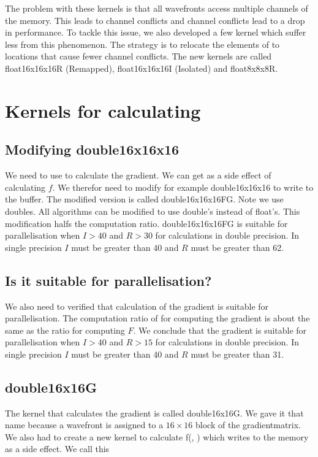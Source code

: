 \documentclass[11pt]{IEEEtran}
\begin{document}
 The problem with these kernels is that all wavefronts access multiple channels of the memory. This leads to channel conflicts and channel conflicts lead to a drop in performance. To tackle this issue, we also developed a few kernel which suffer less from this phenomenon. The strategy is to relocate the elements of \TT{} to locations that cause fewer channel conflicts.   The new kernels are called float16x16x16R (Remapped), float16x16x16I (Isolated) and float8x8x8R.

 
\section{Kernels for calculating \GGG{}}
\subsection{Modifying double16x16x16}
We need to use \FF{} to calculate the gradient. We can get \FF{} as a side effect of calculating $f$. We therefor need to modify for example double16x16x16 to write \FF{} to the buffer. The modified version is called double16x16x16FG. Note we use doubles. All algorithms can be modified to use double's instead of float's. This modification halfs the computation ratio. double16x16x16FG is suitable for parallelisation when $I > 40$ and $R > 30$ for calculations in double precision. In single precision $I$ must be greater than 40 and $R$ must be greater than 62.

\subsection{Is it suitable for parallelisation?}
We also need to verified that calculation of the gradient is suitable for parallelisation. The computation ratio of for computing the gradient is about the same as the ratio for computing $F$. We conclude that the gradient is suitable for parallelisation when $I > 40$ and $R > 15$ for calculations in double precision. In single precision $I$ must be greater than 40 and $R$ must be greater than 31.

\subsection{double16x16G}
The kernel that calculates the gradient is called double16x16G. We gave it that name because a wavefront is assigned to a $16 \times 16$ block of the gradientmatrix. We also had to create a new kernel to calculate f(\TT, \UUU) which writes \FF{} to the memory as a side effect. We call this 
\end{document}

